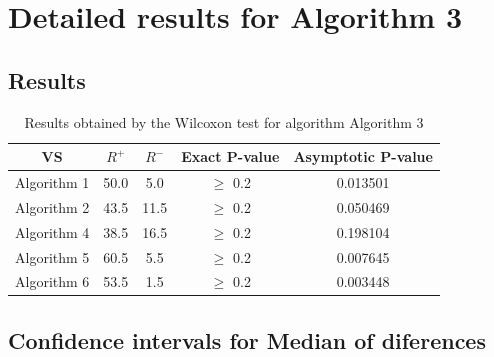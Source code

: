 \documentclass[a4paper,10pt]{article}
\begin{document}
 \clearpage 


\section{Detailed results for Algorithm 3}


\subsection{Results}

\begin{table}[!htp]
\centering\small
\begin{tabular}{
|c|c|c|c|c|}
\hline
 VS & $R^{+}$ & $R^{-}$ & Exact P-value & Asymptotic P-value \\ \hline 
Algorithm 1 & 50.0 & 5.0 & $\geq$ 0.2 & 0.013501\\ \hline 
Algorithm 2 & 43.5 & 11.5 & $\geq$ 0.2 & 0.050469\\ \hline 
Algorithm 4 & 38.5 & 16.5 & $\geq$ 0.2 & 0.198104\\ \hline 
Algorithm 5 & 60.5 & 5.5 & $\geq$ 0.2 & 0.007645\\ \hline 
Algorithm 6 & 53.5 & 1.5 & $\geq$ 0.2 & 0.003448\\ \hline 

\end{tabular}
\caption{Results obtained by the Wilcoxon test for algorithm Algorithm 3}
\end{table}

\subsection{Confidence intervals for Median of diferences}
\end{document}
